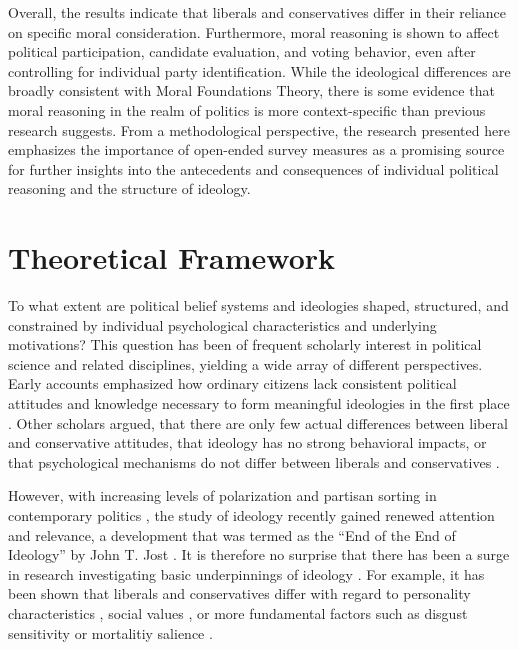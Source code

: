 \documentclass[12pt]{paper}
\begin{document}
Overall, the results indicate that liberals and conservatives differ in their reliance on specific moral consideration. Furthermore, moral reasoning is shown to affect political participation, candidate evaluation, and voting behavior, even after controlling for individual party identification. While the ideological differences are broadly consistent with Moral Foundations Theory, there is some evidence that moral reasoning in the realm of politics is more context-specific than previous research suggests. From a methodological perspective, the research presented here emphasizes the importance of open-ended survey measures as a promising source for further insights into the antecedents and consequences of individual political reasoning and the structure of ideology.


\section{Theoretical Framework}

To what extent are political belief systems and ideologies shaped, structured, and constrained by individual psychological characteristics and underlying motivations? This question has been of frequent scholarly interest in political science and related disciplines, yielding a wide array of different perspectives. Early accounts emphasized how ordinary citizens lack consistent political attitudes and knowledge necessary to form meaningful ideologies in the first place \citep[e.g.][]{converse1964nature}. Other scholars argued, that there are only few actual differences between liberal and conservative attitudes, that ideology has no strong behavioral impacts, or that psychological mechanisms do not differ between liberals and conservatives \citep[see][for an overview regarding each of these points]{jost2006end}.

However, with increasing levels of polarization and partisan sorting in contemporary politics \citep[e.g.][]{iyengar2014fear}, the study of ideology recently gained renewed attention and relevance, a development that was termed as the ``End of the End of Ideology'' by John T. Jost \citeyearpar{jost2006end}. It is therefore no surprise that there has been a surge in research investigating basic underpinnings of ideology \citep[see also][]{jost2003political,jost2009political}. For example, it has been shown that liberals and conservatives differ with regard to personality characteristics \citep{gerber2010personality,hirsh2010compassionate,de2013personality,feldman2013understanding}, social values \citep{schwartz2010basic,schwartz2011basic,piurko2011basic}, or more fundamental factors such as disgust sensitivity \citep{inbar2009conservatives} or mortalitiy salience \citep{burke2013death}.
\end{document}
